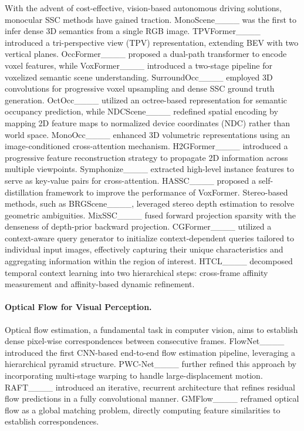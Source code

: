 With the advent of cost-effective, vision-based autonomous driving solutions, monocular SSC methods have gained traction. MonoScene____ was the first to infer dense 3D semantics from a single RGB image. TPVFormer____ introduced a tri-perspective view (TPV) representation, extending BEV with two vertical planes. OccFormer____ proposed a dual-path transformer to encode voxel features, while VoxFormer____ introduced a two-stage pipeline for voxelized semantic scene understanding. SurroundOcc____ employed 3D convolutions for progressive voxel upsampling and dense SSC ground truth generation.
OctOcc____ utilized an octree-based representation for semantic occupancy prediction, while NDCScene____ redefined spatial encoding by mapping 2D feature maps to normalized device coordinates (NDC) rather than world space.
MonoOcc____ enhanced 3D volumetric representations using an image-conditioned cross-attention mechanism. H2GFormer____ introduced a progressive feature reconstruction strategy to propagate 2D information across multiple viewpoints. Symphonize____ extracted high-level instance features to serve as key-value pairs for cross-attention. HASSC____ proposed a self-distillation framework to improve the performance of VoxFormer. Stereo-based methods, such as BRGScene____, leveraged stereo depth estimation to resolve geometric ambiguities. MixSSC____ fused forward projection sparsity with the denseness of depth-prior backward projection.
CGFormer____ utilized a context-aware query generator to initialize context-dependent queries tailored to individual input images, effectively capturing their unique characteristics and aggregating information within the region of interest. HTCL____ decomposed temporal context learning into two hierarchical steps: cross-frame affinity measurement and affinity-based dynamic refinement.
\vspace{-4mm}
\paragraph{Optical Flow for Visual Perception.}
Optical flow estimation, a fundamental task in computer vision, aims to establish dense pixel-wise correspondences between consecutive frames. FlowNet____ introduced the first CNN-based end-to-end flow estimation pipeline, leveraging a hierarchical pyramid structure. PWC-Net____ further refined this approach by incorporating multi-stage warping to handle large-displacement motion. RAFT____ introduced an iterative, recurrent architecture that refines residual flow predictions in a fully convolutional manner. GMFlow____ reframed optical flow as a global matching problem, directly computing feature similarities to establish correspondences.

